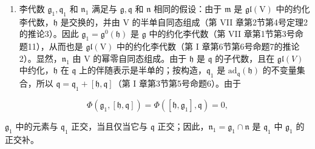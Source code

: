 \begin{enumerate}
\def\labelenumi{\alph{enumi})}
\setcounter{enumi}{2}
\tightlist
\item
  李代数 \(\mathfrak{g}_1, \mathfrak{q}_1\) 和 \(\mathfrak{n}_1\) 满足与 \(\mathfrak{g}, \mathfrak{q}\) 和 \(\mathfrak{n}\) 相同的假设：由于 \(\mathfrak{m}\) 是 \(\mathfrak{gl}(\mathrm{V})\) 中的约化李代数，\(\mathfrak{h}\) 是交换的，并由 V 的半单自同态组成（第 VII 章第2节第4号定理2的推论3）。因此 \(\mathfrak{g}_1 = \mathfrak{g}^0(\mathfrak{h})\) 是 \(\mathfrak{g}\) 中的约化李代数（第 VII 章第1节第3号命题11），从而也是 \(\mathfrak{gl}(\mathrm{V})\) 中的约化李代数（第 I 章第6节第6号命题7的推论2）。显然，\(\mathfrak{n}_1\) 由 V 的幂零自同态组成。由于 \(\mathfrak{h}\) 是 \(\mathfrak{q}\) 的子代数，且在 \(\mathfrak{gl}(V)\) 中约化，\(\mathfrak{h}\) 在 \(\mathfrak{q}\) 上的伴随表示是半单的；按构造，\(\mathfrak{q}_1\) 是 \(\mathrm{ad}_{\mathfrak{q}}(\mathfrak{h})\) 的不变量集合，所以 \(\mathfrak{q} = \mathfrak{q}_1 + [\mathfrak{h}, \mathfrak{q}]\)（第 I 章第3节第5号命题6）。由于
\end{enumerate}

\[
\Phi (\mathfrak {g} _ {1}, [ \mathfrak {h}, \mathfrak {q} ]) = \Phi ([ \mathfrak {h}, \mathfrak {g} _ {1} ], \mathfrak {q}) = 0,
\]

\(\mathfrak{g}_1\) 中的元素与 \(\mathfrak{q}_1\) 正交，当且仅当它与 \(\mathfrak{q}\) 正交；因此，\(\mathfrak{n}_1 = \mathfrak{g}_1 \cap \mathfrak{n}\) 是 \(\mathfrak{q}_1\) 中 \(\mathfrak{g}_1\) 的正交补。

